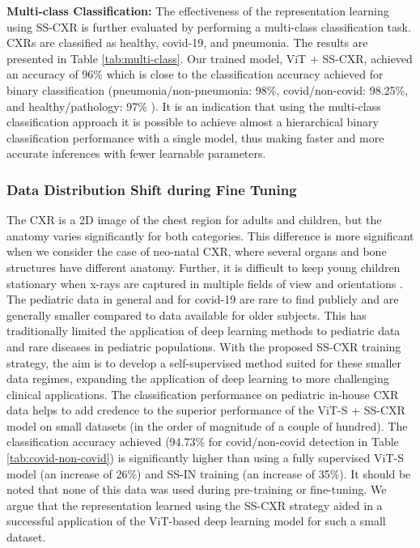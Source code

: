 \documentclass[10pt,journal,compsoc]{IEEEtran}
\begin{document}
\noindent \textbf{Multi-class Classification:}
The effectiveness of the representation learning using SS-CXR is further evaluated by performing a multi-class classification task. CXRs are classified as healthy, covid-19, and pneumonia. The results are presented in Table \ref{tab:multi-class}. Our trained model, ViT + SS-CXR, achieved an accuracy of 96\% which is close to the classification accuracy achieved for binary classification (pneumonia/non-pneumonia: 98\%, covid/non-covid: 98.25\%, and healthy/pathology: 97\% ). It is an indication that using the multi-class classification approach it is possible to achieve almost a hierarchical binary classification performance with a single model, thus making faster and more accurate inferences with fewer learnable parameters.





\subsubsection{Data Distribution Shift during Fine Tuning}\label{finetune_drift}

The CXR is a 2D image of the chest region for adults and children, but the anatomy varies significantly for both categories. This difference is more significant when we consider the case of neo-natal CXR, where several organs and bone structures have different anatomy. Further, it is difficult to keep young children stationary when x-rays are captured in multiple fields of view and orientations \cite{mansoor}. The pediatric data in general and for covid-19 are rare to find publicly and are generally smaller compared to data available for older subjects. This has traditionally limited the application of deep learning methods to pediatric data and rare diseases in pediatric populations. With the proposed SS-CXR training strategy, the aim is to develop a self-supervised method suited for these smaller data regimes, expanding the application of deep learning to more challenging clinical applications. The classification performance on pediatric in-house CXR data helps to add credence to the superior performance of the ViT-S + SS-CXR model on small datasets (in the order of magnitude of a couple of hundred). The  classification accuracy achieved (94.73\% for covid/non-covid detection in Table \ref{tab:covid-non-covid}) is significantly higher than using a fully supervised ViT-S model (an increase of 26\%) and SS-IN training (an increase of 35\%). It should be noted that none of this data was used during pre-training or fine-tuning. We argue that the representation learned using the SS-CXR strategy aided in a successful application of the ViT-based deep learning model for such a small dataset. 
\end{document}
